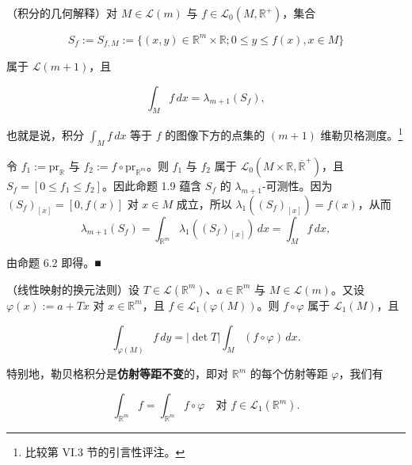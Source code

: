 \begin{example}

\begin{items}
\item

（积分的几何解释）对 $ M \in \mathcal{L}(m) $ 与 $ f \in \mathcal{L}_{0}(M, \mathbb{R}^{+}) $，集合

\[
S_f := S_{f,M} := \{ (x, y) \in \mathbb{R}^m \times \mathbb{R} ; 0 \le y \le f(x), x \in M \}
\]

属于 $ \mathcal{L}(m+1) $，且

\[
\int_{M} f \, dx = \lambda_{m+1}(S_f) ,
\]

也就是说，积分 $ \int_{M} f \, dx $ 等于 $ f $ 的图像下方的点集的 $ (m+1) $ 维勒贝格测度。\footnote{比较第 VI.3 节的引言性评注。}

\end{items}


\proofhead
令 $ f_1 := \mathrm{pr}_{\mathbb{R}} $ 与 $ f_2 := f \circ \mathrm{pr}_{\mathbb{R}^m} $。则 $ f_1 $ 与 $ f_2 $ 属于 $ \mathcal{L}_{0}(M \times \mathbb{R}, \overline{\mathbb{R}}^{+}) $，且 $ S_f = [0 \le f_1 \le f_2] $。因此命题 1.9 蕴含 $ S_f $ 的 $ \lambda_{m+1} $-可测性。因为 $ (S_f)_{[x]} = [0, f(x)] $ 对 $ x \in M $ 成立，所以 $ \lambda_1((S_f)_{[x]}) = f(x) $，从而
\[
\lambda_{m+1}(S_f) = \int_{\mathbb{R}^m} \lambda_1((S_f)_{[x]}) \, dx = \int_{M} f \, dx ,
\]

由命题 6.2 即得。\nobreak\hspace{0.35em}■

\begin{items}
\item[（b）]

（线性映射的换元法则）设 $ T \in \mathcal{L}(\mathbb{R}^m) $、$ a \in \mathbb{R}^m $ 与 $ M \in \mathcal{L}(m) $。又设 $ \varphi(x) := a + Tx $ 对 $ x \in \mathbb{R}^m $，且 $ f \in \mathcal{L}_{1}(\varphi(M)) $。则 $ f \circ \varphi $ 属于 $ \mathcal{L}_{1}(M) $，且

\begin{equation}
\int_{\varphi(M)} f \, dy = |\det T| \int_{M} (f \circ \varphi) \, dx .\tag{6.4}
\end{equation}

特别地，勒贝格积分是\textbf{仿射等距不变}的，即对 $ \mathbb{R}^m $ 的每个仿射等距 $ \varphi $，我们有

\[
\int_{\mathbb{R}^m} f = \int_{\mathbb{R}^m} f \circ \varphi \quad \text{对 } f \in \mathcal{L}_{1}(\mathbb{R}^m) .
\]


\end{items}
\end{example}
